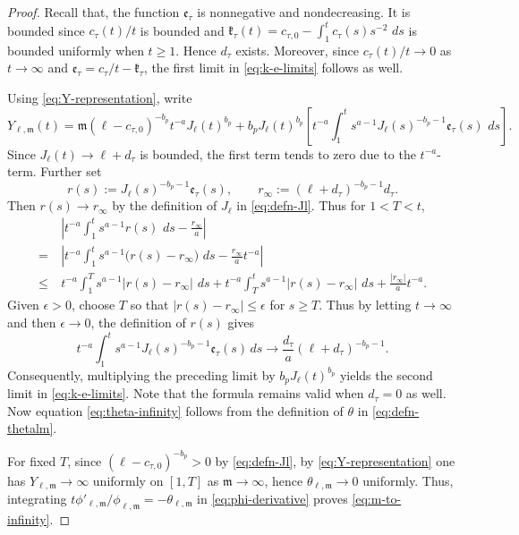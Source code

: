 \documentclass[reqno,12pt]{amsart}
\numberwithin{equation}{section}
\theoremstyle{remark}
\newcommand{\dd}{\,d}
\begin{document}
\begin{proof}
Recall that, the function $\mathfrak e_\tau$ is nonnegative and nondecreasing.  It is bounded since $c_\tau(t)/t$ is bounded and $\mathfrak k_\tau(t)=c_{\tau,0}-\int_1^tc_\tau(s)s^{-2}\,\dd s$ is bounded uniformly when $t\ge1$.  Hence $d_\tau$ exists.  Moreover, since $c_\tau(t)/t\to 0$ as $t\to \infty$ and
$\mathfrak e_\tau=c_\tau/t-\mathfrak k_\tau$, the first limit in \eqref{eq:k-e-limits} follows as well.

Using \eqref{eq:Y-representation}, write
$$
Y_{\ell,\mathfrak m}(t)
=\mathfrak m(\ell-c_{\tau,0})^{-b_p}
t^{-a}J_\ell(t)^{b_p} + b_pJ_\ell(t)^{b_p}
\left[t^{-a}\int_1^t s^{a-1}J_\ell(s)^{-b_p-1}
\mathfrak e_\tau(s)\,\dd s \right].
$$
Since $J_\ell(t)\to\ell+d_\tau$ is bounded, the first term tends to zero due to the $t^{-a}$-term.
Further set
$$
r(s):=J_\ell(s)^{-b_p-1}\mathfrak e_\tau(s),
\qquad r_\infty:=(\ell+d_\tau)^{-b_p-1}d_\tau .
$$
Then $r(s)\to r_\infty$ by the definition of $J_\ell$ in \eqref{eq:defn-Jl}.  Thus for $1<T<t$,
\begin{align*}
&\ \left|t^{-a}\int_1^t s^{a-1}r(s)\,\dd s
-\frac{r_\infty}{a}\right|\\
=& \ \left| t^{-a}\int_1^t s^{a-1}\bigl(r(s)-r_\infty\bigr)\,\dd s -\frac{r_\infty}{a}t^{-a} \right|\\
\le& \ t^{-a}\int_1^T
s^{a-1}|r(s)-r_\infty|\,\dd s+
t^{-a}\int_T^t s^{a-1}|r(s)-r_\infty|\,\dd s +\frac{|r_\infty|}{a}t^{-a}.
\end{align*}
Given $\epsilon>0$, choose $T$ so that $|r(s)-r_\infty|\le\epsilon$ for $s\ge T$.  Thus by letting $t\to\infty$ and then $\epsilon\to 0$, the definition of $r(s)$ gives
$$
 t^{-a}\int_1^t  s^{a-1}J_\ell(s)^{-b_p-1}\mathfrak e_\tau(s)\dd s \to \frac{d_\tau}{a}(\ell+d_\tau)^{-b_p-1}.
$$
Consequently, multiplying the preceding limit by $b_p J_\ell(t)^{b_p}$ yields the second limit in \eqref{eq:k-e-limits}. Note that the formula remains valid when $d_\tau=0$ as well.  Now equation \eqref{eq:theta-infinity} follows from the definition of $\theta$ in \eqref{eq:defn-thetalm}.

For fixed $T$, since $(\ell-c_{\tau, 0})^{-b_p}>0$ by \eqref{eq:defn-Jl},  by \eqref{eq:Y-representation}  one has $Y_{\ell,\mathfrak m}\to\infty$ uniformly on $[1, T]$ as $\mathfrak m\to \infty$, hence
$\theta_{\ell,\mathfrak m}\to0$ uniformly.  Thus, integrating
$t\phi'_{\ell,\mathfrak m}/\phi_{\ell,\mathfrak m}=-\theta_{\ell,\mathfrak m}$ in \eqref{eq:phi-derivative} proves \eqref{eq:m-to-infinity}.
\end{proof}
\end{document}
